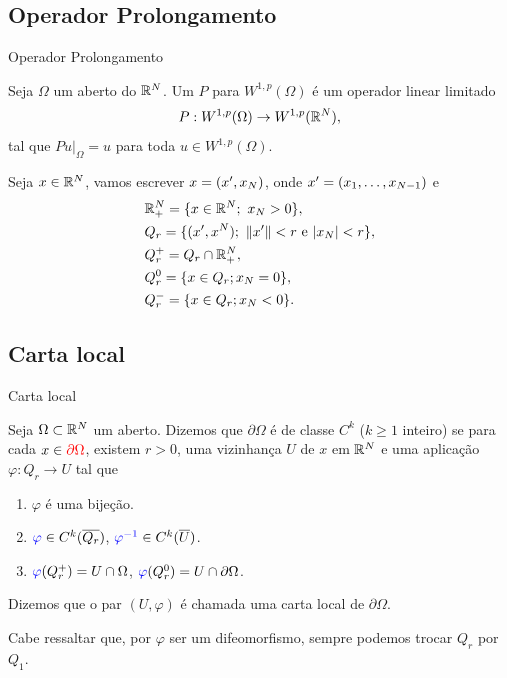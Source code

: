 \subsection*{Operador Prolongamento}

\begin{frame}{Operador Prolongamento}
	\begin{defin}
		Seja $\Omega$ um aberto do $\mathbb{R}^N$. Um  $P$ para $W^{1,p}(\Omega)$ é um operador linear limitado
		\[P:W^{1,p}(\Omega)\to W^{1,p}(\mathbb{R}^N),\]
		tal que $Pu\vert_\Omega =u$ para toda $u\in W^{1,p}(\Omega)$.
	\end{defin}

	Seja $x\in \mathbb{R}^N$, vamos escrever $x=(x',x_N)$, onde $x'=(x_1,\ldots,x_{N-1})$ e 
	\begin{align*}
	& \mathbb{R}^N_+=\{x\in \mathbb{R}^N;\ x_N>0\},\\
	& Q_r=\{(x',x^N);\ \|x'\|<r \text{ e } |x_N|<r\},\\
	& Q_r^+=Q_r\cap \mathbb{R}^N_+,\\
	& Q_r^0=\{x\in Q_r; x_N=0\},\\
	& Q_r^{-}=\{x\in Q_r; x_N<0\}.
\end{align*}

\end{frame}


\subsection*{Carta local}
\begin{frame}{Carta local}
\begin{defin}
	Seja $\Omega\subset \mathbb{R}^N$ um aberto. Dizemos que {\color{red}\(\partial \Omega\) é de classe $C^k$} ($k\geq 1$ inteiro) se para cada $x\in {\color{red} \partial \Omega }$, existem {\color{blue} \(r>0\)},  uma vizinhança {\color{blue}$U$} de $x$ em $\mathbb{R}^N$ e uma aplicação {\color{blue}$\varphi:Q_r\longrightarrow U$}  tal que 
	\begin{enumerate}
		\item{\color{blue} $\varphi$} é uma bijeção.
		\item ${\color{blue}\varphi}\in C^k(\overline{Q_r})$, ${\color{blue}\varphi^{-1}}\in C^k(\overline{U})$.
		\item ${\color{blue}\varphi}(Q_r^+)=U\cap \Omega$, ${\color{blue}\varphi}(Q_r^0)=U\cap \partial \Omega$.
	\end{enumerate}
Dizemos que o par {\color{blue} \((U, \varphi)\)} é chamada uma {\color{blue}carta local} de {\color{red} \(\partial \Omega\)}.
\end{defin}

\begin{obs}
Cabe ressaltar que, por {\color{blue} \(\varphi\)} ser um difeomorfismo, sempre podemos trocar {\color{blue} \(Q_r\)} por \(Q_1\).
\end{obs}


\end{frame}


